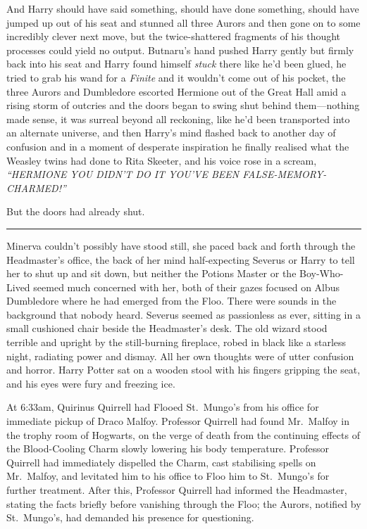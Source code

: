 And Harry should have said something, should have done something, should
have jumped up out of his seat and stunned all three Aurors and then
gone on to some incredibly clever next move, but the twice-shattered
fragments of his thought processes could yield no output. Butnaru's hand
pushed Harry gently but firmly back into his seat and Harry found
himself \emph{stuck} there like he'd been glued, he tried to grab his
wand for a \emph{Finite} and it wouldn't come out of his pocket, the
three Aurors and Dumbledore escorted Hermione out of the Great Hall amid
a rising storm of outcries and the doors began to swing shut behind
them---nothing made sense, it was surreal beyond all reckoning, like
he'd been transported into an alternate universe, and then Harry's mind
flashed back to another day of confusion and in a moment of desperate
inspiration he finally realised what the Weasley twins had done to Rita
Skeeter, and his voice rose in a scream, \emph{``HERMIONE YOU DIDN'T DO
IT YOU'VE BEEN FALSE-MEMORY-CHARMED!''}

But the doors had already shut.

\begin{center}\rule{3in}{0.4pt}\end{center}

Minerva couldn't possibly have stood still, she paced back and forth
through the Headmaster's office, the back of her mind half-expecting
Severus or Harry to tell her to shut up and sit down, but neither the
Potions Master or the Boy-Who-Lived seemed much concerned with her, both
of their gazes focused on Albus Dumbledore where he had emerged from the
Floo. There were sounds in the background that nobody heard. Severus
seemed as passionless as ever, sitting in a small cushioned chair beside
the Headmaster's desk. The old wizard stood terrible and upright by the
still-burning fireplace, robed in black like a starless night, radiating
power and dismay. All her own thoughts were of utter confusion and
horror. Harry Potter sat on a wooden stool with his fingers gripping the
seat, and his eyes were fury and freezing ice.

At 6:33am, Quirinus Quirrell had Flooed St.~Mungo's from his office for
immediate pickup of Draco Malfoy. Professor Quirrell had found
Mr.~Malfoy in the trophy room of Hogwarts, on the verge of death from
the continuing effects of the Blood-Cooling Charm slowly lowering his
body temperature. Professor Quirrell had immediately dispelled the
Charm, cast stabilising spells on Mr.~Malfoy, and levitated him to his
office to Floo him to St.~Mungo's for further treatment. After this,
Professor Quirrell had informed the Headmaster, stating the facts
briefly before vanishing through the Floo; the Aurors, notified by
St.~Mungo's, had demanded his presence for questioning.

